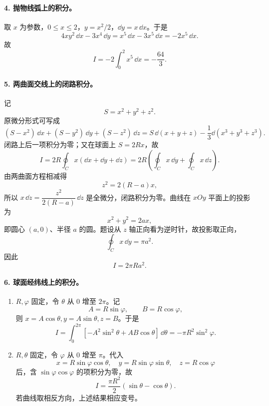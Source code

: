 \paragraph{4. 抛物线弧上的积分。}
\begin{xsolution}
取 $x$ 为参数，$0\le x\le2$，$y=x^2/2$，$\dd y=x\,\dd x$。于是
\[
  4xy^2\,\dd x-3x^4\,\dd y
  =x^5\,\dd x-3x^5\,\dd x=-2x^5\,\dd x.
\]
故
\[
  I=-2\int_0^2x^5\,\dd x=-\frac{64}{3}.
\]
\end{xsolution}

\paragraph{5. 两曲面交线上的闭路积分。}
\begin{xsolution}
记
\[
  S=x^2+y^2+z^2.
\]
原微分形式可写成
\[
  (S-x^2)\,\dd x+(S-y^2)\,\dd y+(S-z^2)\,\dd z
  =S\,\dd(x+y+z)-\frac13\dd(x^3+y^3+z^3).
\]
闭路上后一项积分为零；又在球面上 $S=2Rx$，故
\[
  I=2R\oint_Cx(\dd x+\dd y+\dd z)
   =2R\left(\oint_Cx\,\dd y+\oint_Cx\,\dd z\right).
\]
由两曲面方程相减得
\[
  z^2=2(R-a)x,
\]
所以 $x\,\dd z=\dfrac{z^2}{2(R-a)}\,\dd z$ 是全微分，闭路积分为零。曲线在 $xOy$ 平面上的投影为
\[
  x^2+y^2=2ax,
\]
即圆心 $(a,0)$、半径 $a$ 的圆。题设从 $z$ 轴正向看为逆时针，故投影取正向，
\[
  \oint_Cx\,\dd y=\pi a^2.
\]
因此
\[
  I=2\pi Ra^2.
\]
\end{xsolution}

\paragraph{6. 球面经纬线上的积分。}
\begin{xsolution}
\begin{enumerate}[label=(\arabic*)]
\item $R,\varphi$ 固定，令 $\theta$ 从 $0$ 增至 $2\pi$。记
\[
  A=R\sin\varphi,\qquad B=R\cos\varphi,
\]
则 $x=A\cos\theta,y=A\sin\theta,z=B$。于是
\[
  I=\int_0^{2\pi}\left[-A^2\sin^2\theta+AB\cos\theta\right]\,\dd\theta
  =-\pi R^2\sin^2\varphi.
\]

\item $R,\theta$ 固定，令 $\varphi$ 从 $0$ 增至 $\pi$。代入
\[
  x=R\sin\varphi\cos\theta,
  \quad y=R\sin\varphi\sin\theta,
  \quad z=R\cos\varphi
\]
后，含 $\sin\varphi\cos\varphi$ 的项积分为零，故
\[
  I=\frac{\pi R^2}{2}(\sin\theta-\cos\theta).
\]
若曲线取相反方向，上述结果相应变号。
\end{enumerate}
\end{xsolution}

